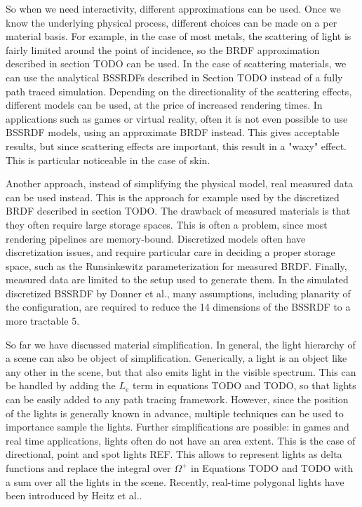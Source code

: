 So when we need interactivity, different approximations can be used. Once we know the underlying physical process, different choices can be made on a per material basis. For example, in the case of most metals, the scattering of light is fairly limited around the point of incidence, so the BRDF approximation described in section TODO can be used. In the case of scattering materials, we can use the analytical BSSRDFs described in Section TODO instead of a fully path traced simulation. Depending on the directionality of the scattering effects, different models can be used, at the price of increased rendering times. In applications such as games or virtual reality, often it is not even possible to use BSSRDF models, using an approximate BRDF instead. This gives acceptable results, but since scattering effects are important, this result in a "waxy" effect. This is particular noticeable in the case of skin. 

Another approach, instead of simplifying the physical model, real measured data can be used instead. This is the approach for example used by the discretized BRDF described in section TODO. The drawback of measured materials is that they often require large storage spaces. This is often a problem, since most rendering pipelines are memory-bound. Discretized models often have discretization issues, and require particular care in deciding a proper storage space, such as the Runsinkewitz parameterization for measured BRDF. Finally, measured data are limited to the setup used to generate them. In the simulated discretized BSSRDF by Donner et al.\cite{Donner2009}, many assumptions, including planarity of the configuration, are required to reduce the 14 dimensions of the BSSRDF to a more tractable 5.  

So far we have discussed material simplification. In general, the light hierarchy of a scene can also be object of simplification. Generically, a light is an object like any other in the scene, but that also emits light in the visible spectrum. This can be handled by adding the $L_e$ term in equations TODO and TODO, so that lights can be easily added to any path tracing framework. However, since the position of the lights is generally known in advance, multiple techniques can be used to importance sample the lights. Further simplifications are possible: in games and real time applications, lights often do not have an area extent. This is the case of directional, point and spot lights REF. This allows to represent lights as delta functions and replace the integral over $\Omega^+$ in Equations TODO and TODO with a sum over all the lights in the scene. Recently, real-time polygonal lights have been introduced by Heitz et al.\cite{Heitz2016}.

